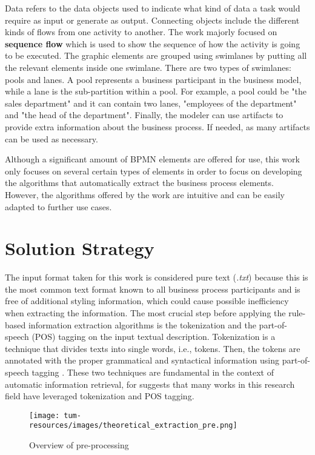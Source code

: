 Data refers to the data objects used to indicate what kind of data a task would require as input or generate as output. Connecting objects include the different kinds of flows from one activity to another. The work majorly focused on \textbf{sequence flow} which is used to show the sequence of how the activity is going to be executed. The graphic elements are grouped using swimlanes by putting all the relevant elements inside one swimlane. There are two types of swimlanes: pools and lanes. A pool represents a business participant in the business model, while a lane is the sub-partition within a pool. For example, a pool could be "the sales department" and it can contain two lanes, "employees of the department" and "the head of the department". Finally, the modeler can use artifacts to provide extra information about the business process. If needed, as many artifacts can be used as necessary.

Although a significant amount of BPMN elements are offered for use, this work only focuses on several certain types of elements in order to focus on developing the algorithms that automatically extract the business process elements. However, the algorithms offered by the work are intuitive and can be easily adapted to further use cases.

\section{Solution Strategy}
The input format taken for this work is considered pure text (\textit{.txt}) because this is the most common text format known to all business process participants and is free of additional styling information, which could cause possible inefficiency when extracting the information. The most crucial step before applying the rule-based information extraction algorithms is the tokenization and the part-of-speech (POS) tagging on the input textual description. Tokenization is a technique that divides texts into single words, i.e., tokens. Then, the tokens are annotated with the proper grammatical and syntactical information using part-of-speech tagging \cite{literature_review_2}. These two techniques are fundamental in the context of automatic information retrieval, for \cite{literature_review_1} suggests that many works in this research field have leveraged tokenization and POS tagging.

\begin{figure}[h]
    \centering
    \caption{Overview of pre-processing}
    \texttt{[image: tum-resources/images/theoretical\_extraction\_pre.png]}
\end{figure}

